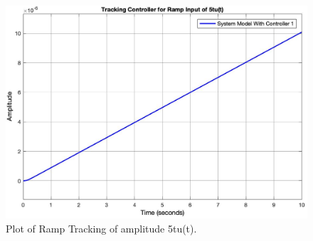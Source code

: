 \documentclass{article}
\begin{document}
\begin{figure}[h!]
\centering
\includegraphics[scale=0.25]{TrackingControllerResponse.jpg}
\caption{Plot of Ramp Tracking of amplitude 5tu(t).}
\end{figure}
\end{document}
